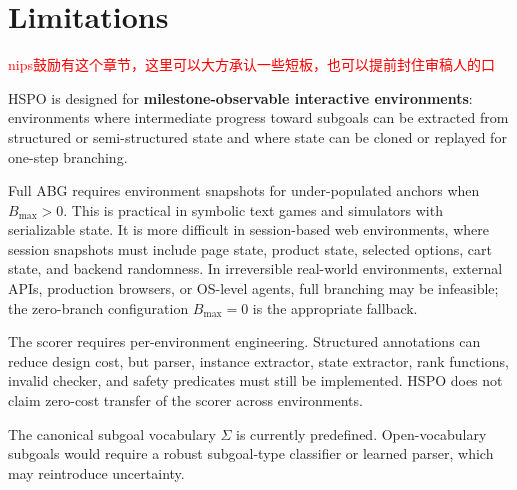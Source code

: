 \documentclass{article}
\newcommand{\wei}[1]{\textcolor{red}{#1}}
\begin{document}
\section{Limitations}
\wei{nips鼓励有这个章节，这里可以大方承认一些短板，也可以提前封住审稿人的口}

HSPO is designed for \textbf{milestone-observable interactive environments}: environments where intermediate progress toward subgoals can be extracted from structured or semi-structured state and where state can be cloned or replayed for one-step branching.

Full ABG requires environment snapshots for under-populated anchors when $B_{\max} > 0$. This is practical in symbolic text games and simulators with serializable state. It is more difficult in session-based web environments, where session snapshots must include page state, product state, selected options, cart state, and backend randomness. In irreversible real-world environments, external APIs, production browsers, or OS-level agents, full branching may be infeasible; the zero-branch configuration $B_{\max} = 0$ is the appropriate fallback.

The scorer requires per-environment engineering. Structured annotations can reduce design cost, but parser, instance extractor, state extractor, rank functions, invalid checker, and safety predicates must still be implemented. HSPO does not claim zero-cost transfer of the scorer across environments.

The canonical subgoal vocabulary $\Sigma$ is currently predefined. Open-vocabulary subgoals would require a robust subgoal-type classifier or learned parser, which may reintroduce uncertainty.
\end{document}
